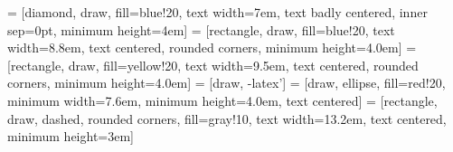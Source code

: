 

\usepackage[T1]{fontenc}
\usepackage[utf8]{inputenc}
\RequirePackage[scaled]{helvet} %

\usepackage{styles/elegantmacros}

\newcommand{\makepart}[1]{%
	\part{#1}\frame{\partpage}
}

\usepackage{graphicx}
\usepackage{booktabs}
\usepackage{colortbl}
\usepackage{ragged2e}
\usepackage{schemabloc}
\usepackage{caption}
\usepackage{subcaption}
\usepackage{tabularx}
\usepackage{array}
\usepackage{multirow}
\usepackage{wrapfig}
\usepackage{pgfplots}
\usepackage{adjustbox}
\usepackage{environ}
\pgfplotsset{compat=1.18}

\RequirePackage[%
natbib=true,
backend=biber,
style=apa,
isbn=false,
url=false,
uniquename=false
]{biblatex}



\usepackage{tikz}
\usetikzlibrary{shapes,arrows,positioning,fit,backgrounds}

 = [diamond, draw, fill=blue!20,
text width=7em, text badly centered, inner sep=0pt, minimum height=4em]
 = [rectangle, draw, fill=blue!20,
text width=8.8em, text centered, rounded corners, minimum height=4.0em]
 = [rectangle, draw, fill=yellow!20,
text width=9.5em, text centered, rounded corners, minimum height=4.0em]
 = [draw, -latex']
 = [draw, ellipse, fill=red!20,
minimum width=7.6em, minimum height=4.0em, text centered]
 = [rectangle, draw, dashed, rounded corners, fill=gray!10,
text width=13.2em, text centered, minimum height=3em]

